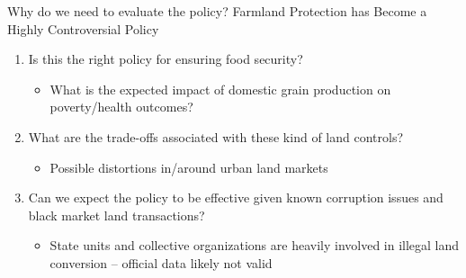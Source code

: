 \documentclass[newPxFont]{beamer}
\begin{document}
\begin{frame}[c]{Why do we need to evaluate the policy?}
	Farmland Protection has Become a Highly Controversial Policy	
	\begin{enumerate}   
		\item{Is this the right policy for ensuring food security?}  
		\begin{itemize}
			\item{What is the expected impact of domestic grain production on poverty/health outcomes?}
		\end{itemize}
		\item{What are the trade-offs associated with these kind of land controls?}
		\begin{itemize}
			\item{Possible distortions in/around urban land markets}
		\end{itemize}
		\item{Can we expect the policy to be effective given known corruption issues and black market land transactions?}
		\begin{itemize}
			\item{State units and collective organizations are heavily involved in illegal land conversion -- official data likely not valid}
		\end{itemize}
	\end{enumerate}	
\end{frame}

%
%
\end{document}
